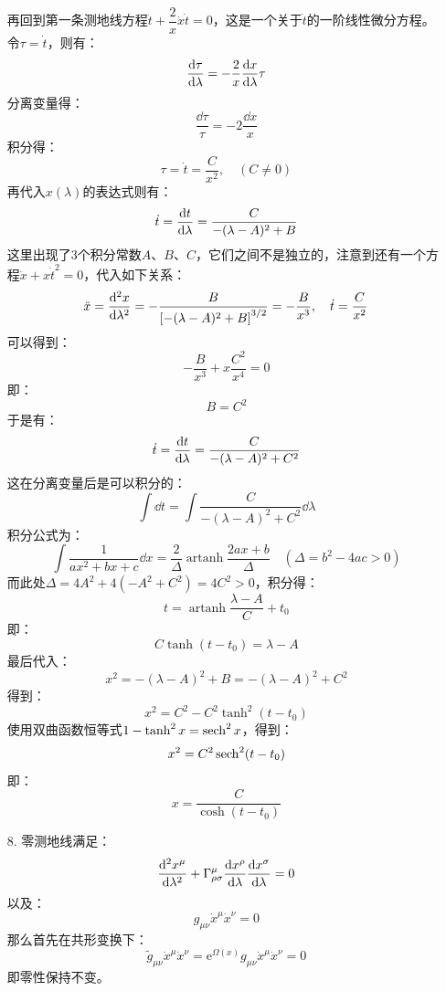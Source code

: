 \documentclass[a4paper]{article}
\DeclareMathOperator{\artanh}{artanh}
\begin{document}
\begin{enumerate}
    再回到第一条测地线方程$\ddot{t} + \dfrac{2}{x}\dot{x}\dot{t} = 0$，这是一个关于$\dot{t}$的一阶线性微分方程。令$\tau = \dot{t}$，则有：
    \[
        \dv{\tau}{\lambda} = -\frac{2}{x} \dv{x}{\lambda} \tau
    \]
    分离变量得：
    \[
        \frac{\dd{\tau}}{\tau} = -2 \frac{\dd{x}}{x}
    \]
    积分得：
    \[
        \tau = \dot{t} = \frac{C}{x^2},\quad (C \neq 0)
    \]
    再代入$x(\lambda)$的表达式则有：
    \[
        \dot{t} = \dv{t}{\lambda} = \frac{C}{-(\lambda - A)^2 + B}
    \]
    这里出现了3个积分常数$A$、$B$、$C$，它们之间不是独立的，注意到还有一个方程$\ddot{x} + x\dot{t}^2 = 0$，代入如下关系：
    \[
        \ddot{x} = \dv[2]{x}{\lambda} = -\frac{B}{\qty[-(\lambda - A)^2 + B]^{3/2}} = -\frac{B}{x^3},\quad \dot{t} = \frac{C}{x^2}
    \]
    可以得到：
    \[
        -\frac{B}{x^3} + x\frac{C^2}{x^4} = 0
    \]
    即：
    \[
        B = C^2
    \]
    于是有：
    \[
        \dot{t} = \dv{t}{\lambda} = \frac{C}{-(\lambda - A)^2 + C^2}
    \]
    这在分离变量后是可以积分的：
    \[
        \int \dd{t} = \int \frac{C}{-(\lambda - A)^2 + C^2} \dd{\lambda}
    \]
    积分公式为：
    \[
        \int \frac{1}{ax^2 + bx + c} \dd{x} = \frac{2}{\Delta} \artanh{\frac{2ax + b}{\Delta}}\quad (\Delta = b^2 - 4ac > 0)
    \]
    而此处$\Delta = 4A^2 + 4(-A^2 + C^2) = 4C^2 > 0$，积分得：
    \[
        t = \artanh{\frac{\lambda - A}{C}} + t_0
    \]
    即：
    \[
        C\tanh(t - t_0) = \lambda - A
    \]
    最后代入：
    \[
        x^2 = -(\lambda - A)^2 + B = -(\lambda - A)^2 + C^2
    \]
    得到：
    \[
        x^2 = C^2 - C^2\tanh^2(t - t_0)
    \]
    使用双曲函数恒等式$1 - \tanh^2{x} = \sech^2{x}$，得到：
    \[
        x^2 = C^2\sech^2(t - t_0)
    \]
    即：
    \[
        x = \frac{C}{\cosh(t - t_0)}
    \]

    \bigskip
    \item[8.]
    零测地线满足：
    \[
        \dv[2]{x^\mu}{\lambda} + \Gamma^\mu_{\rho\sigma} \dv{x^\rho}{\lambda} \dv{x^\sigma}{\lambda} = 0
    \]
    以及：
    \[
        g_{\mu\nu} \dot{x}^\mu \dot{x}^\nu = 0
    \]
    那么首先在共形变换下：
    \[
        \tilde{g}_{\mu\nu} \dot{x}^\mu \dot{x}^\nu = \mathrm{e}^{\Omega(x)} g_{\mu\nu} \dot{x}^\mu \dot{x}^\nu = 0
    \]
    即零性保持不变。


\end{enumerate}
\end{document}
